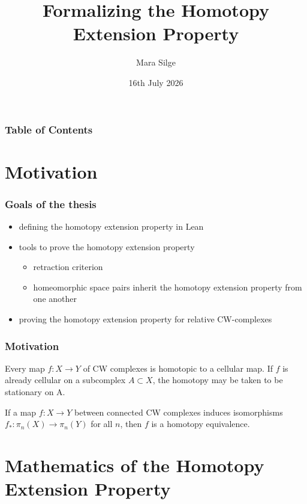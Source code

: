 \documentclass{beamer}
\title{Formalizing the Homotopy Extension Property}
\author{Mara Silge}
\date{16th July 2026}
\begin{document}
\begin{frame}
\titlepage
\end{frame}

\begin{frame}
\frametitle{Table of Contents}
\tableofcontents
\end{frame}


\section{Motivation}
\begin{frame}
\frametitle{Goals of the thesis}
\begin{itemize}
\item defining the homotopy extension property in Lean
\item tools to prove the homotopy extension property
\begin{itemize}
\item retraction criterion
\item homeomorphic space pairs inherit the homotopy extension property from one another
\end{itemize}
\item proving the homotopy extension property for relative CW-complexes
\end{itemize}
\end{frame}

\begin{frame}
\frametitle{Motivation}
\begin{theorem} 
    Every map $f \colon X \to Y $ of CW complexes is homotopic to a cellular map. If $f$ is already cellular on a subcomplex $A \subset X$, the homotopy may be taken to be stationary on A.
\end{theorem}
\begin{theorem} 
    If a map $f \colon X \to Y$ between connected CW complexes induces isomorphisms $f_* \colon \pi_n (X) \to  \pi _n (Y) $ for all $n$, then $f$ is a homotopy equivalence. 
\end{theorem}
\end{frame}


\section{Mathematics of the Homotopy Extension Property}
\end{document}

